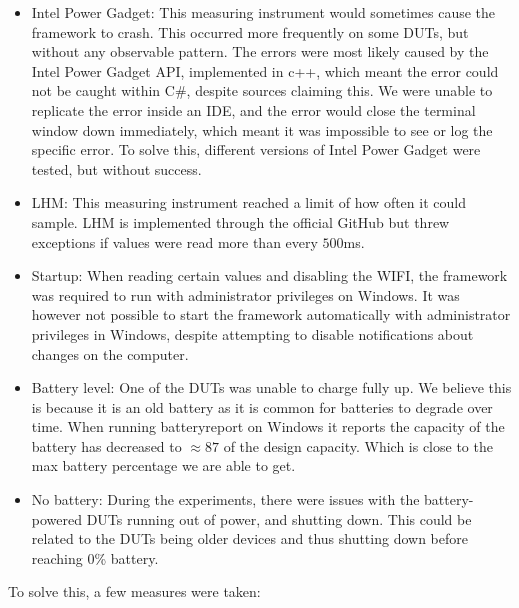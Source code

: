 \begin{itemize}
    \item Intel Power Gadget: This measuring instrument would sometimes cause the framework to crash. This occurred more frequently on some DUTs, but without any observable pattern. The errors were most likely caused by the Intel Power Gadget API, implemented in c++, which meant the error could not be caught within C\#, despite sources claiming this\cite[]{cpp_exceptions}. We were unable to replicate the error inside an IDE, and the error would close the terminal window down immediately, which meant it was impossible to see or log the specific error. To solve this, different versions of Intel Power Gadget were tested, but without success. %
    \item LHM: This measuring instrument reached a limit of how often it could sample. LHM is implemented through the official GitHub but threw exceptions if values were read more than every $500$ms.
    \item Startup: When reading certain values and disabling the WIFI, the framework was required to run with administrator privileges on Windows. It was however not possible to start the framework automatically with administrator privileges in Windows, despite attempting to disable notifications about changes on the computer. 
    \item Battery level: One of the DUTs was unable to charge fully up. We believe this is because it is an old battery as it is common for batteries to degrade over time. When running batteryreport on Windows it reports the capacity of the battery has decreased to $\approx87$ of the design capacity. Which is close to the max battery percentage we are able to get.
    \item No battery: During the experiments, there were issues with the battery-powered DUTs running out of power, and shutting down. This could be related to the DUTs being older devices and thus shutting down before reaching 0\% battery.
\end{itemize}

To solve this, a few measures were taken:

